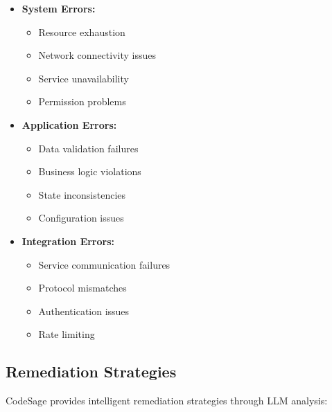 \begin{itemize}
    \item \textbf{System Errors:}
    \begin{itemize}
        \item Resource exhaustion
        \item Network connectivity issues
        \item Service unavailability
        \item Permission problems
    \end{itemize}
    
    \item \textbf{Application Errors:}
    \begin{itemize}
        \item Data validation failures
        \item Business logic violations
        \item State inconsistencies
        \item Configuration issues
    \end{itemize}
    
    \item \textbf{Integration Errors:}
    \begin{itemize}
        \item Service communication failures
        \item Protocol mismatches
        \item Authentication issues
        \item Rate limiting
    \end{itemize}
\end{itemize}

\subsection{Remediation Strategies}
CodeSage provides intelligent remediation strategies through LLM analysis:

